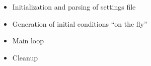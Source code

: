 \documentclass[a4paper,10pt]{article}
\begin{document}
\begin{itemize}
 \item Initialization and parsing of settings file
 \item Generation of initial conditions ``on the fly'' %
 \item Main loop %
 \item Cleanup
\end{itemize}
\end{document}
